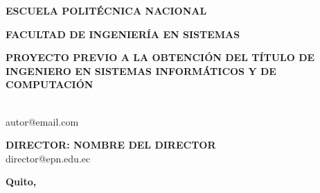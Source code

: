 \begin{titlepage}
  \centering

  {\huge\bf\MakeUppercase{Escuela Politécnica Nacional}}
  \vfill

  {\Large\bf\MakeUppercase{Facultad de Ingeniería en Sistemas}}
  \vfill

  {\large\bf\MakeUppercase{\thetitle}}
  \vfill

  {\bf\MakeUppercase{Proyecto Previo a la Obtención del Título de Ingeniero en
  Sistemas Informáticos y de Computación}}
  \vfill

  {\bf\MakeUppercase{\theauthor}} \\
  autor@email.com
  \vfill

  {\bf\MakeUppercase{Director: Nombre del Director}} \\
  director@epn.edu.ec
  \vfill

  {\bf{Quito, \coverdate{\thedate}}}
  \vfill
\end{titlepage}
